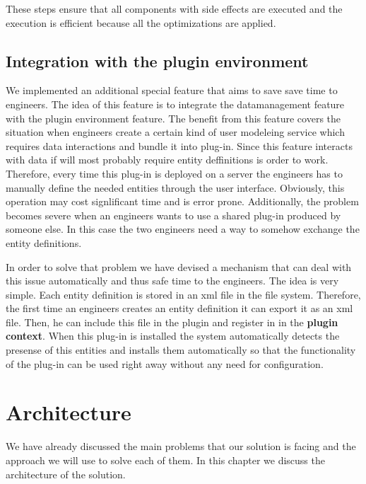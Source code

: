 \documentclass[a4paper, notitlepage]{article}
\begin{document}
These steps ensure that all components with side effects are executed and the execution is efficient because all the optimizations are applied.

\subsection{Integration with the plugin environment}

We implemented an additional special feature that aims to save save time to engineers. The idea of this feature is to integrate the datamanagement feature with the plugin environment feature. The benefit from this feature covers the situation when engineers create a certain kind of user modeleing service which requires data interactions and  bundle it into plug-in. Since this feature interacts with data if will most probably require entity deffinitions is order to work. Therefore, every time this plug-in is deployed on a server the engineers has to manually define the needed entities through the user interface. Obviously, this operation may cost signlificant time and is error prone. Additionally, the problem becomes severe when an engineers wants to use a shared plug-in produced by someone else. In this case the two engineers need a way to somehow exchange the entity definitions.

In order to solve that problem we have devised a mechanism that can deal with this issue automatically and thus safe time to the engineers. The idea is very simple. Each entity definition is stored in an xml file in the file system. Therefore, the first time an engineers creates an entity definition it can export it as an xml file. Then, he can include this file in the plugin and register in in the \textbf{plugin context}. When this plug-in is installed the system automatically detects the presense of this entities and installs them automatically so that the functionality of the plug-in can be used right away without any need for configuration.

\section{Architecture}
We have already discussed the main problems that our solution is facing and the approach we will use to solve each of them. In this chapter we discuss the architecture of the solution.
\end{document}
